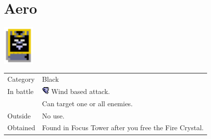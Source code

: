 \section{Aero}
\label{spell:aero}

\includegraphics[height=2cm,keepaspectratio]{./resources/spells/aero}

\begin{longtable}{ l p{9cm} }
	Category
	& Black
\\ %
	In battle
	& \includegraphics[height=1em,keepaspectratio]{./resources/effects/wind} Wind based attack. \\
	& Can target one or all enemies.
\\ %
	Outside
	& No use.
\\ %
	Obtained
	& Found in Focus Tower after you free the Fire Crystal.
\end{longtable}
